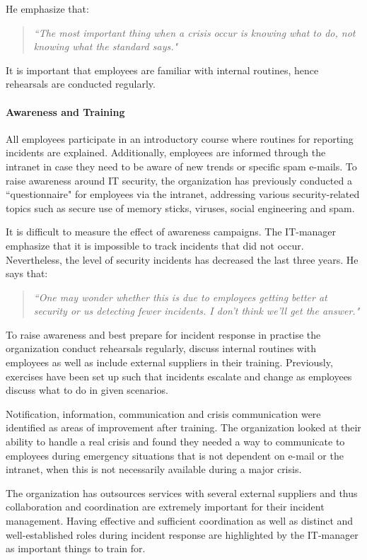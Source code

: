 He emphasize that:
\begin{quote}
\textit{``The most important thing when a crisis occur is knowing what to do, not knowing what the standard says."}
\end{quote}
It is important that employees are familiar with internal routines, hence rehearsals are conducted regularly.

\paragraph{Awareness and Training}
All employees participate in an introductory course where routines for reporting incidents are explained. Additionally, employees are informed through the intranet in case they need to be aware of new trends or specific spam e-mails. To raise awareness around IT security, the organization has previously conducted a ``questionnaire" for employees via the intranet, addressing various security-related topics such as secure use of memory sticks, viruses, social engineering and spam. 

It is difficult to measure the effect of awareness campaigns. The IT-manager emphasize that it is impossible to track incidents that did not occur. Nevertheless, the level of security incidents has decreased the last three years. He says that:
\begin{quote}
\textit{``One may wonder whether this is due to employees getting better at security or us detecting fewer incidents. I don't think we'll get the answer."}
\end{quote}
 
To raise awareness and best prepare for incident response in practise the organization conduct rehearsals regularly, discuss internal routines with employees as well as include external suppliers in their training. Previously, exercises have been set up such that incidents escalate and change as employees discuss what to do in given scenarios.%

Notification, information, communication and crisis communication were identified as areas of improvement after training. The organization looked at their ability to handle a real crisis and found they needed a way to communicate to employees during emergency situations that is not dependent on e-mail or the intranet, when this is not necessarily available during a major crisis.

The organization has outsources services with several external suppliers and thus collaboration and coordination are extremely important for their incident management. Having effective and sufficient coordination as well as distinct and well-established roles during incident response are highlighted by the IT-manager as important things to train for.

